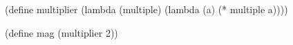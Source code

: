 \begin{minipage}{3in}
  \begin{AVerb}[gobble=4,numbers=left]
    (define multiplier \label{lang_fig2_scheme_fun}
      (lambda (multiple)  
        (lambda (a) (* multiple a))))

    (define mag \label{lang_fig2_scheme_mag}
      (multiplier 2))
  \end{AVerb}
\end{minipage}
